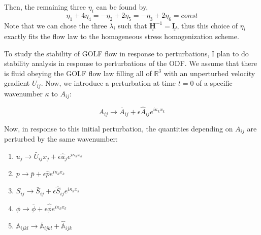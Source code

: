 \documentclass{report}
\begin{document}
Then, the remaining three $\eta_i$ can be found by,
\begin{equation}
   \eta_1 + 4 \eta_4 = -\eta_2 + 2 \eta_5 = -\eta_3 + 2 \eta_6 = const
\end{equation}
Note that we can chose the three $\lambda_i$ such that $\underline{\underline{\mathbf{H}}}^{-1} = \underline{\underline{\mathbf{L}}}$, thus this choice of $\eta_i$ exactly fits the flow law to the homogeneous stress homogenization scheme.

To study the stability of GOLF flow in response to perturbations, I plan to do stability analysis in response to perturbations of the ODF. We assume that there is fluid obeying the GOLF flow law filling all of $\mathbb{R}^3$ with an unperturbed velocity gradient $U_{ij}$. Now, we introduce a perturbation at time $t=0$ of a specific wavenumber $\kappa$ to $A_{ij}$:

\begin{equation}
   A_{ij} \rightarrow \bar{A}_{ij} +  \epsilon \hat{A}_{ij} e^{i \kappa_k x_k}
\end{equation}

Now, in response to this initial perturbation, the quantities depending on $A_{ij}$ are perturbed by the same wavenumber:

\begin{enumerate}
   \item $u_j \rightarrow \bar{U}_{ij}x_j +  \epsilon \hat{u}_j e^{i \kappa_k x_k}$
   \item $p \rightarrow \bar{p} + \epsilon \hat{p} e^{i \kappa_k x_k}$
   \item $S_{ij} \rightarrow \bar{S}_{ij} +  \epsilon \hat{S}_{ij} e^{i \kappa_k x_k}$
   \item $\phi \rightarrow \bar{\phi} + \epsilon \hat{\phi} e^{i \kappa_k x_k}$
   \item $\mathbb{A}_{ijkl} \rightarrow \bar{\mathbb{A}}_{ijkl} + \hat{\mathbb{A}}_{ijk}$
\end{enumerate}
\end{document}
